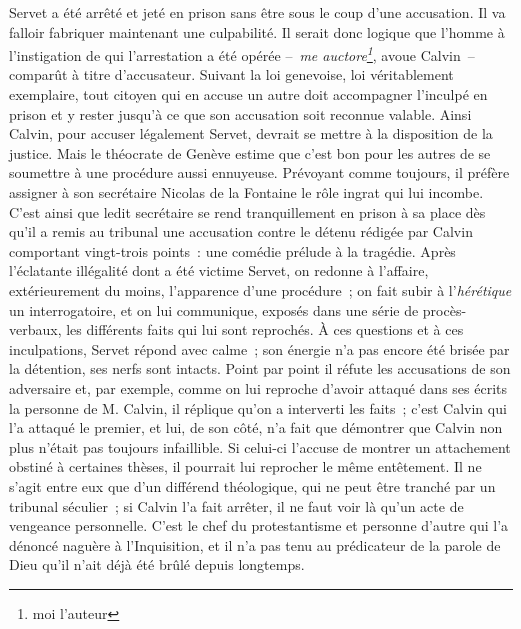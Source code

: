 \documentclass[french,twoside]{book} %
\newcommand\foreign[1]{\emph{#1}}
\begin{document}
\noindent Servet a été arrêté et jeté en prison sans être sous le coup d’une accusation. Il va falloir fabriquer maintenant une culpabilité. Il serait donc logique que l’homme à l’instigation de qui l’arrestation a été opérée – \foreign{me auctore\footnote{moi l’auteur}}, avoue Calvin – comparût à titre d’accusateur. Suivant la loi genevoise, loi véritablement exemplaire, tout citoyen qui en accuse un autre doit accompagner l’inculpé en prison et y rester jusqu’à ce que son accusation soit reconnue valable. Ainsi Calvin, pour accuser légalement Servet, devrait se mettre à la disposition de la justice. Mais le théocrate de Genève estime que c’est bon pour les autres de se soumettre à une procédure aussi ennuyeuse. Prévoyant comme toujours, il préfère assigner à son secrétaire Nicolas de la Fontaine le rôle ingrat qui lui incombe. C’est ainsi que ledit secrétaire se rend tranquillement en prison à sa place dès qu’il a remis au tribunal une accusation contre le détenu rédigée par Calvin comportant vingt-trois points : une comédie prélude à la tragédie. Après l’éclatante illégalité dont a été victime Servet, on redonne à l’affaire, extérieurement du moins, l’apparence d’une procédure ; on fait subir à l’\emph{hérétique} un interrogatoire, et on lui communique, exposés dans une série de procès-verbaux, les différents faits qui lui sont reprochés. À ces questions et à ces inculpations, Servet répond avec calme ; son énergie n’a pas encore été brisée par la détention, ses nerfs sont intacts. Point par point il réfute les accusations de son adversaire et, par exemple, comme on lui reproche d’avoir attaqué dans ses écrits la personne de M. Calvin, il réplique qu’on a interverti les faits ; c’est Calvin qui l’a attaqué le premier, et lui, de son côté, n’a fait que démontrer que Calvin non plus n’était pas toujours infaillible. Si celui-ci l’accuse de montrer un attachement obstiné à certaines thèses, il pourrait lui reprocher le même entêtement. Il ne s’agit entre eux que d’un différend théologique, qui ne peut être tranché par un tribunal séculier ; si Calvin l’a fait arrêter, il ne faut voir là qu’un acte de vengeance personnelle. C’est le chef du protestantisme et personne d’autre qui l’a dénoncé naguère à l’Inquisition, et il n’a pas tenu au prédicateur de la parole de Dieu qu’il n’ait déjà été brûlé depuis longtemps.\par
\end{document}
